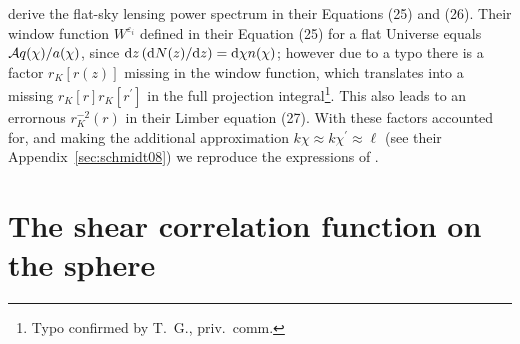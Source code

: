 \documentclass[fleqn,usenatbib]{mnras} %
\newcommand{\pref}{{\cal A}}
\begin{document}
\begin{appendix}
\cite{2012MNRAS.422.2854G} derive the flat-sky lensing power spectrum in their
Equations (25) and (26). Their window function $W^{\varepsilon_i}$ defined in
their Equation (25) for a flat Universe equals $\pref q(\chi) / a(\chi)$, since
${\rm d} z \, ({\rm d} N(z)/{\rm d} z) = {\rm d} \chi n(\chi)$; however due to
a typo there is a factor $r_K[r(z)]$ missing in the window function, which
translates into a missing $r_K[r] r_K[r^\prime]$ in the full projection
integral\footnote{Typo confirmed by T.~G., priv.~comm.}. This also leads to an
errornous $r_K^{-2}(r)$ in their Limber equation (27). With these factors
accounted for, and making the additional approximation $k \chi \approx k
\chi^\prime \approx \ell$ (see their Appendix~\ref{sec:schmidt08}) we reproduce
the expressions of \cite{2012MNRAS.422.2854G}.

\section{The shear correlation function on the sphere}
\label{app:C}

\label{lastpage}

\end{appendix}
\end{document}

